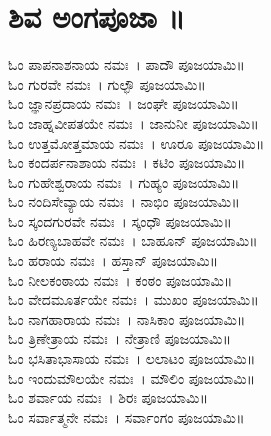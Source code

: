 \section{ಶಿವ ಅಂಗಪೂಜಾ ॥}
ಓಂ ಪಾಪನಾಶನಾಯ ನಮಃ~। ಪಾದೌ ಪೂಜಯಾಮಿ॥\\
ಓಂ ಗುರವೇ ನಮಃ~। ಗುಲ್ಫೌ ಪೂಜಯಾಮಿ॥\\
ಓಂ ಜ್ಞಾನಪ್ರದಾಯ ನಮಃ~। ಜಂಘೇ ಪೂಜಯಾಮಿ॥\\
ಓಂ ಜಾಹ್ನವೀಪತಯೇ ನಮಃ~। ಜಾನುನೀ ಪೂಜಯಾಮಿ॥\\
ಓಂ ಉತ್ತಮೋತ್ತಮಾಯ ನಮಃ~। ಊರೂ ಪೂಜಯಾಮಿ॥\\
ಓಂ ಕಂದರ್ಪನಾಶಾಯ ನಮಃ~। ಕಟಿಂ ಪೂಜಯಾಮಿ॥\\
ಓಂ ಗುಹೇಶ್ವರಾಯ ನಮಃ~। ಗುಹ್ಯಂ ಪೂಜಯಾಮಿ॥\\
ಓಂ ನಂದಿಸೇವ್ಯಾಯ ನಮಃ~। ನಾಭಿಂ ಪೂಜಯಾಮಿ॥\\
ಓಂ ಸ್ಕಂದಗುರವೇ ನಮಃ~। ಸ್ಕಂಧೌ ಪೂಜಯಾಮಿ॥\\
ಓಂ ಹಿರಣ್ಯಬಾಹವೇ ನಮಃ~। ಬಾಹೂನ್ ಪೂಜಯಾಮಿ॥\\
ಓಂ ಹರಾಯ ನಮಃ~। ಹಸ್ತಾನ್ ಪೂಜಯಾಮಿ॥\\
ಓಂ ನೀಲಕಂಠಾಯ ನಮಃ~। ಕಂಠಂ ಪೂಜಯಾಮಿ॥\\
ಓಂ ವೇದಮೂರ್ತಯೇ ನಮಃ~। ಮುಖಂ ಪೂಜಯಾಮಿ॥\\
ಓಂ ನಾಗಹಾರಾಯ ನಮಃ~। ನಾಸಿಕಾಂ ಪೂಜಯಾಮಿ॥\\
ಓಂ ತ್ರಿಣೇತ್ರಾಯ ನಮಃ~। ನೇತ್ರಾಣಿ ಪೂಜಯಾಮಿ॥\\
ಓಂ ಭಸಿತಾಭಾಸಾಯ ನಮಃ~। ಲಲಾಟಂ ಪೂಜಯಾಮಿ॥\\
ಓಂ ಇಂದುಮೌಲಯೇ ನಮಃ~। ಮೌಲಿಂ ಪೂಜಯಾಮಿ॥\\
ಓಂ ಶರ್ವಾಯ ನಮಃ~। ಶಿರಃ ಪೂಜಯಾಮಿ॥\\
ಓಂ ಸರ್ವಾತ್ಮನೇ ನಮಃ~। ಸರ್ವಾಂಗಂ ಪೂಜಯಾಮಿ॥
